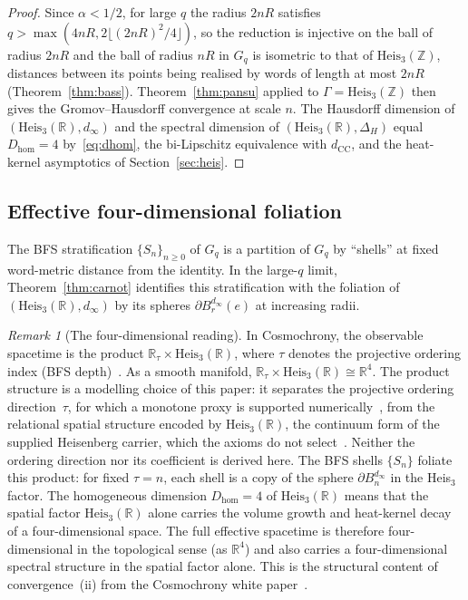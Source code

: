 \documentclass[11pt,a4paper]{article}
\theoremstyle{definition}
\theoremstyle{remark}
\newtheorem{remark}[theorem]{Remark}
\newcommand{\HeisR}{\mathrm{Heis}_3(\mathbb{R})}
\newcommand{\HeisZZ}{\mathrm{Heis}_3(\mathbb{Z})}
\newcommand{\dCC}{d_{\mathrm{CC}}}
\newcommand{\DeltaH}{\Delta_H}
\newcommand{\Gq}{G_q}
\newcommand{\Sn}{S_n}
\newcommand{\Dhom}{D_{\mathrm{hom}}}
\begin{document}
    \begin{proof}
      Since $\alpha < 1/2$, for large $q$ the radius $2nR$ satisfies $q > \max(4nR, 2\lfloor (2nR)^2/4\rfloor)$, so
      the reduction is injective on the ball of radius $2nR$ and the ball of radius $nR$ in $\Gq$ is isometric to
      that of $\HeisZZ$, distances between its points being realised by words of length at most $2nR$
      (Theorem~\ref{thm:bass}).
      Theorem~\ref{thm:pansu} applied to $\Gamma = \HeisZZ$ then gives the Gromov--Hausdorff
      convergence at scale $n$.
      The Hausdorff dimension of $(\HeisR, d_\infty)$ and the spectral dimension of $(\HeisR, \DeltaH)$ equal
      $\Dhom = 4$ by~\eqref{eq:dhom}, the bi-Lipschitz equivalence with $\dCC$, and the heat-kernel asymptotics of
      Section~\ref{sec:heis}.
    \end{proof}

  \subsection{Effective four-dimensional foliation}

    The BFS stratification $\{\Sn\}_{n \geq 0}$ of $\Gq$ is a partition of $\Gq$ by
    ``shells'' at fixed word-metric distance from the identity.
    In the large-$q$ limit, Theorem~\ref{thm:carnot} identifies this stratification with
    the foliation of $(\HeisR, d_\infty)$ by its spheres
    $\partial B_r^{d_\infty}(e)$ at increasing radii.

    \begin{remark}[The four-dimensional reading]
      \label{rem:4d}
      In Cosmochrony, the observable spacetime is the product
      $\mathbb{R}_\tau \times \HeisR$, where $\tau$ denotes the projective ordering
      index (BFS depth)~\cite{Beau2026pto,Cosmochrony}.
      As a smooth manifold, $\mathbb{R}_\tau \times \HeisR \cong \mathbb{R}^4$.
      The product structure is a modelling choice of this paper: it separates the projective ordering
      direction~$\tau$, for which a monotone proxy is supported numerically~\cite{Beau2026pto}, from the relational
      spatial structure encoded by $\HeisR$, the continuum form of the supplied Heisenberg carrier, which the axioms
      do not select~\cite{Beau2026m,Beau2026HeisenbergStructure}.
      Neither the ordering direction nor its coefficient is derived here.
      The BFS shells $\{\Sn\}$ foliate this product: for fixed $\tau = n$, each shell is a
      copy of the sphere $\partial B_n^{d_\infty}$ in the Heis$_3$ factor.
      The homogeneous dimension $\Dhom = 4$ of $\HeisR$ means that the spatial factor
      $\HeisR$ alone carries the volume growth and heat-kernel decay of a four-dimensional
      space.
      The full effective spacetime is therefore four-dimensional in the topological sense
      (as $\mathbb{R}^4$) and also carries a four-dimensional spectral structure in the
      spatial factor alone.
      This is the structural content of convergence~(ii) from the Cosmochrony white
      paper~\cite{Cosmochrony}.
    \end{remark}
\end{document}
